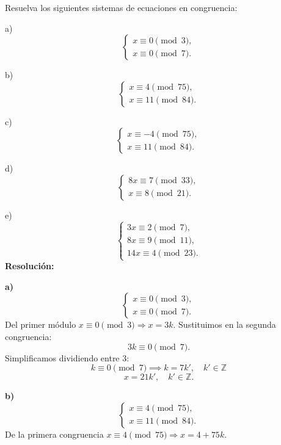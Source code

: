\documentclass[a4paper,12pt]{article}
\begin{document}
\begin{ejercicio}[title=Ejercicio 37]
Resuelva los siguientes sistemas de ecuaciones en congruencia:

a) 
\[
\begin{cases}
x \equiv 0 \pmod{3},\\
x \equiv 0 \pmod{7}.
\end{cases}
\]

b)
\[
\begin{cases}
x \equiv 4 \pmod{75},\\
x \equiv 11 \pmod{84}.
\end{cases}
\]

c)
\[
\begin{cases}
x \equiv -4 \pmod{75},\\
x \equiv 11 \pmod{84}.
\end{cases}
\]

d)
\[
\begin{cases}
8x \equiv 7 \pmod{33},\\
x \equiv 8 \pmod{21}.
\end{cases}
\]

e)
\[
\begin{cases}
3x \equiv 2 \pmod{7},\\
8x \equiv 9 \pmod{11},\\
14x \equiv 4 \pmod{23}.
\end{cases}
\]
\tcblower
\textbf{Resolución:}

\textbf{a)} \\[0.3em]
\[
\begin{cases}
x \equiv 0 \pmod{3},\\
x \equiv 0 \pmod{7}.
\end{cases}
\]
Del primer módulo $x\equiv 0\pmod{3}\Rightarrow x=3k$. Sustituimos en la segunda congruencia:
\[
3k \equiv 0 \pmod{7}.
\]
Simplificamos dividiendo entre 3:
\[
k \equiv 0 \pmod{7} \implies k = 7k',\quad k'\in \mathbb{Z}
\]
\[
\boxed{x = 21k',\quad k'\in\mathbb{Z}.}
\]

\vspace{0.8em}

\textbf{b)} \\[0.3em]
\[
\begin{cases}
x \equiv 4 \pmod{75},\\
x \equiv 11 \pmod{84}.
\end{cases}
\]
De la primera congruencia $x\equiv 4\pmod{75}\Rightarrow x=4+75k$.

\end{ejercicio}
\end{document}
